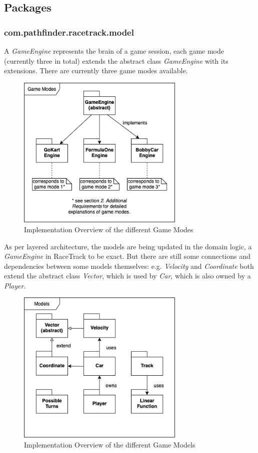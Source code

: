 		\subsection{Packages}

			\subsubsection{com.pathfinder.racetrack.model}
				A \textit{GameEngine} represents the brain of a game session, each game mode (currently three in total) extends the abstract class \textit{GameEngine} with its extensions. There are currently three game modes available.
				\begin{figure}[H]
					\centering
					\includegraphics[width=8cm,keepaspectratio,center]{img/Implementation_Code_Game-Modes.png}
					\caption{Implementation Overview of the different Game Modes}
				\end{figure}
				As per layered architecture, the models are being updated in the domain logic, a \textit{GameEngine} in RaceTrack to be exact. But there are still some connections and dependencies between some models themselves: e.g. \textit{Velocity} and \textit{Coordinate} both extend the abstract class \textit{Vector}, which is used by \textit{Car}, which is also owned by a \textit{Player}.
				\begin{figure}[H]
					\centering
					\includegraphics[width=8cm,keepaspectratio,center]{img/Implementation_Code_Models.png}
					\caption{Implementation Overview of the different Game Models}
				\end{figure}

